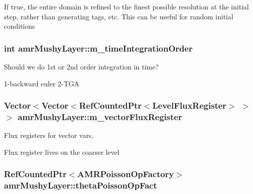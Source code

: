 If true, the entire domain is refined to the finest possible resolution at the initial step, rather than generating tags, etc. This can be useful for random initial conditions \hypertarget{classamr_mushy_layer_a1c6df6b648acbc11679adc49c7148992}{
\subsubsection[{m\-\_\-time\-Integration\-Order}]{\setlength{\rightskip}{0pt plus 5cm}int amr\-Mushy\-Layer\-::m\-\_\-time\-Integration\-Order\hspace{0.3cm}{\ttfamily [protected]}}}\label{classamr_mushy_layer_a1c6df6b648acbc11679adc49c7148992}
Should we do 1st or 2nd order integration in time? \par
1-\/backward euler 2-\/\-T\-G\-A \hypertarget{classamr_mushy_layer_ab8be3498c90ee0be2b448e479239126d}{
\subsubsection[{m\-\_\-vector\-Flux\-Register}]{\setlength{\rightskip}{0pt plus 5cm}Vector$<$Vector$<$Ref\-Counted\-Ptr$<$Level\-Flux\-Register$>$ $>$ $>$ amr\-Mushy\-Layer\-::m\-\_\-vector\-Flux\-Register\hspace{0.3cm}{\ttfamily [protected]}}}\label{classamr_mushy_layer_ab8be3498c90ee0be2b448e479239126d}


Flux registers for vector vars. 

Flux register lives on the coarser level \hypertarget{classamr_mushy_layer_abcd65730bc3f80c5b274ab3249d74cb6}{
\subsubsection[{theta\-Poisson\-Op\-Fact}]{\setlength{\rightskip}{0pt plus 5cm}Ref\-Counted\-Ptr$<$A\-M\-R\-Poisson\-Op\-Factory$>$ amr\-Mushy\-Layer\-::theta\-Poisson\-Op\-Fact\hspace{0.3cm}{\ttfamily [protected]}}}\label{classamr_mushy_layer_abcd65730bc3f80c5b274ab3249d74cb6}



